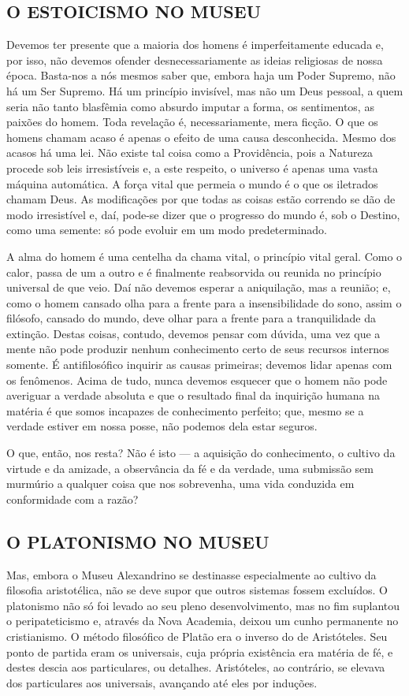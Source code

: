 \documentclass[11pt,a5paper,twoside,openany]{book}
\begin{document}
\subsection*{O ESTOICISMO NO MUSEU}
Devemos ter presente que a maioria dos homens é imperfeitamente educada e, por isso, não devemos ofender desnecessariamente as ideias religiosas de nossa época. Basta-nos a nós mesmos saber que, embora haja um Poder Supremo, não há um Ser Supremo. Há um princípio invisível, mas não um Deus pessoal, a quem seria não tanto blasfêmia como absurdo imputar a forma, os sentimentos, as paixões do homem. Toda revelação é, necessariamente, mera ficção. O que os homens chamam acaso é apenas o efeito de uma causa desconhecida. Mesmo dos acasos há uma lei. Não existe tal coisa como a Providência, pois a Natureza procede sob leis irresistíveis e, a este respeito, o universo é apenas uma vasta máquina automática. A força vital que permeia o mundo é o que os iletrados chamam Deus. As modificações por que todas as coisas estão correndo se dão de modo irresistível e, daí, pode-se dizer que o progresso do mundo é, sob o Destino, como uma semente: só pode evoluir em um modo predeterminado.

A alma do homem é uma centelha da chama vital, o princípio vital geral. Como o calor, passa de um a outro e é finalmente reabsorvida ou reunida no princípio universal de que veio. Daí não devemos esperar a aniquilação, mas a reunião; e, como o homem cansado olha para a frente para a insensibilidade do sono, assim o filósofo, cansado do mundo, deve olhar para a frente para a tranquilidade da extinção. Destas coisas, contudo, devemos pensar com dúvida, uma vez que a mente não pode produzir nenhum conhecimento certo de seus recursos internos somente. É antifilosófico inquirir as causas primeiras; devemos lidar apenas com os fenômenos. Acima de tudo, nunca devemos esquecer que o homem não pode averiguar a verdade absoluta e que o resultado final da inquirição humana na matéria é que somos incapazes de conhecimento perfeito; que, mesmo se a verdade estiver em nossa posse, não podemos dela estar seguros.

O que, então, nos resta? Não é isto — a aquisição do conhecimento, o cultivo da virtude e da amizade, a observância da fé e da verdade, uma submissão sem murmúrio a qualquer coisa que nos sobrevenha, uma vida conduzida em conformidade com a razão?

\subsection*{O PLATONISMO NO MUSEU}
Mas, embora o Museu Alexandrino se destinasse especialmente ao cultivo da filosofia aristotélica, não se deve supor que outros sistemas fossem excluídos. O platonismo não só foi levado ao seu pleno desenvolvimento, mas no fim suplantou o peripateticismo e, através da Nova Academia, deixou um cunho permanente no cristianismo. O método filosófico de Platão era o inverso do de Aristóteles. Seu ponto de partida eram os universais, cuja própria existência era matéria de fé, e destes descia aos particulares, ou detalhes. Aristóteles, ao contrário, se elevava dos particulares aos universais, avançando até eles por induções.
\end{document}
